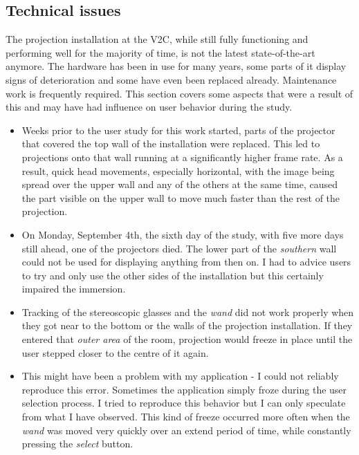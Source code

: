 		\subsection{Technical issues}
		\label{sec:technical_issues}
The projection installation at the V2C, while still fully functioning and performing well for the majority of time, is not the latest state-of-the-art anymore. The hardware has been in use for many years, some parts of it display signs of deterioration and some have even been replaced already. Maintenance work is frequently required. This section covers some aspects that were a result of this and may have had influence on user behavior during the study.

\begin{itemize}
	\item Weeks prior to the user study for this work started, parts of the projector that covered the top wall of the installation were replaced. This led to projections onto that wall running at a significantly higher frame rate. As a result, quick head movements, especially horizontal, with the image being spread over the upper wall and any of the others at the same time, caused the part visible on the upper wall to move much faster than the rest of the projection.
	\item On Monday, September 4th, the sixth day of the study, with five more days still ahead, one of the projectors died. The lower part of the \textit{southern} wall could not be used for displaying anything from then on. I had to advice users to try and only use the other sides of the installation but this certainly impaired the immersion. 
	\item Tracking of the stereoscopic glasses and the \textit{wand} did not work properly when they got near to the bottom or the walls of the projection installation. If they entered that \textit{outer area} of the room, projection would freeze in place until the user stepped closer to the centre of it again.
	\item This might have been a problem with my application - I could not reliably reproduce this error. Sometimes the application simply froze during the user selection process. I tried to reproduce this behavior but I can only speculate from what I have observed. This kind of freeze occurred more often when the \textit{wand} was moved very quickly over an extend period of time, while constantly pressing the \textit{select} button.
\end{itemize}

